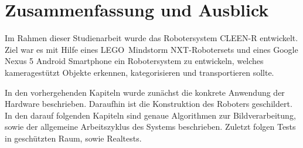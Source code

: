 \chapter{Zusammenfassung und Ausblick}
\label{cha:Fazit}

Im Rahmen dieser Studienarbeit wurde das Robotersystem CLEEN-R entwickelt. Ziel war es mit Hilfe eines LEGO\textregistered\ Mindstorm NXT-Robotersets und eines Google Nexus 5 Android Smartphone ein Robotersystem zu entwickeln, welches kameragestützt Objekte erkennen, kategorisieren und transportieren sollte. 

In den vorhergehenden Kapiteln wurde zunächst die konkrete Anwendung der Hardware beschrieben. Daraufhin ist die Konstruktion des Roboters geschildert. In den darauf folgenden Kapiteln sind genaue Algorithmen zur Bildverarbeitung, sowie der allgemeine Arbeitszyklus des Systems beschrieben. Zuletzt folgen Tests in geschützten Raum, sowie Realtests.